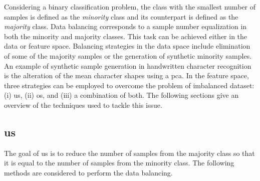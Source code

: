 Considering a binary classification problem, the class with the smallest number of samples is defined as the \textit{minority} class and its counterpart is defined as the \textit{majority} class.
Data balancing corresponds to a sample number equalization in both the minority and majority classes. 
This task can be achieved either in the data or feature space.
Balancing strategies in the data space include elimination of some of the majority samples or the generation of synthetic minority samples. 
An example of synthetic sample generation in handwritten character recognition is the alteration of the mean character shapes using a \ac{pca}. 
In the feature space, three strategies can be employed to overcome the problem of imbalanced dataset: (i) \acf{us}, (ii) \acf{os}, and (iii) a combination of both.
The following sections give an overview of the techniques used to tackle this issue.

\subsection{\acl{us}}

The goal of \ac{us} is to reduce the number of samples from the majority class so that it is equal to the number of samples from the minority class.
The following methods are considered to perform the data balancing.

